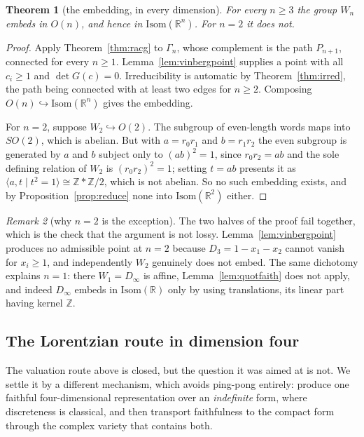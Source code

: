 \documentclass[11pt]{article}
\newtheorem{theorem}{Theorem}[section]
\theoremstyle{definition}
\theoremstyle{remark}
\newtheorem{remark}[theorem]{Remark}
\theoremstyle{definition}
\begin{document}
\begin{theorem}[the embedding, in every dimension]\label{thm:alln}
For every $n\ge3$ the group $W_n$ embeds in $O(n)$, and hence in $\mathrm{Isom}(\mathbb{R}^n)$. For
$n=2$ it does not.
\end{theorem}

\begin{proof}
Apply Theorem~\ref{thm:racg} to $\Gamma_n$, whose complement is the path $P_{n+1}$, connected for
every $n\ge1$. Lemma~\ref{lem:vinbergpoint} supplies a point with all $c_i\ge1$ and
$\det G(c)=0$. Irreducibility is automatic by Theorem~\ref{thm:irred}, the path being
connected with at least two edges for $n\ge2$. Composing
$O(n)\hookrightarrow\mathrm{Isom}(\mathbb{R}^n)$ gives the embedding.

For $n=2$, suppose $W_2\hookrightarrow O(2)$. The subgroup of even-length words maps into $SO(2)$,
which is abelian. But with $a=r_0r_1$ and $b=r_1r_2$ the even subgroup is generated by $a$ and $b$
subject only to $(ab)^2=1$, since $r_0r_2=ab$ and the sole defining relation of $W_2$ is
$(r_0r_2)^2=1$; setting $t=ab$ presents it as $\langle a,t\mid t^2=1\rangle\cong
\mathbb{Z}*\mathbb{Z}/2$, which is not abelian. So no such embedding exists, and by
Proposition~\ref{prop:reduce} none into $\mathrm{Isom}(\mathbb{R}^2)$ either.
\end{proof}

\begin{remark}[why $n=2$ is the exception]\label{rem:n2}
The two halves of the proof fail together, which is the check that the argument is not lossy.
Lemma~\ref{lem:vinbergpoint} produces no admissible point at $n=2$ because
$D_3=1-x_1-x_2$ cannot vanish for $x_i\ge1$, and independently $W_2$ genuinely does not embed. The
same dichotomy explains $n=1$: there $W_1=D_\infty$ is affine, Lemma~\ref{lem:quotfaith} does not
apply, and indeed $D_\infty$ embeds in $\mathrm{Isom}(\mathbb{R})$ only by using translations, its
linear part having kernel $\mathbb{Z}$.
\end{remark}

\subsection{The Lorentzian route in dimension four}\label{sec:w4embed}

The valuation route above is closed, but the question it was aimed at is not. We settle it by a
different mechanism, which avoids ping-pong entirely: produce one faithful four-dimensional
representation over an \emph{indefinite} form, where discreteness is classical, and then transport
faithfulness to the compact form through the complex variety that contains both.
\end{document}

